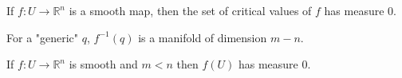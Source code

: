 \begin{theorem}[Sard]
    If  $ f:U\rightarrow \mathbb{R}^n $ is a smooth map, then the set of critical values of  $ f $ has measure $  0 $.
\end{theorem}
\begin{remark}
    For a "generic"  $ q  $,  $ f^{-1}(q)  $ is a manifold of dimension  $ m-n $. 
\end{remark}
\begin{corollary}
    If  $ f:U\rightarrow\mathbb{R}^n $ is smooth and  $ m<n  $ then  $ f(U ) $ has measure $  0  $. 
\end{corollary}
